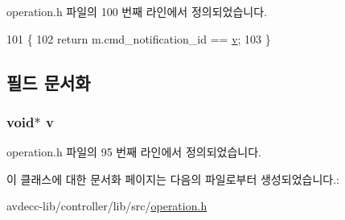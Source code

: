 operation.\+h 파일의 100 번째 라인에서 정의되었습니다.


\begin{DoxyCode}
101     \{
102         \textcolor{keywordflow}{return} m.cmd\_notification\_id == \hyperlink{classavdecc__lib_1_1notification__comp_a67806b49e20fb1170422969965db6ecb}{v};
103     \}
\end{DoxyCode}


\subsection{필드 문서화}
\subsubsection[{\texorpdfstring{v}{v}}]{\setlength{\rightskip}{0pt plus 5cm}void$\ast$ v\hspace{0.3cm}{\ttfamily [private]}}\hypertarget{classavdecc__lib_1_1notification__comp_a67806b49e20fb1170422969965db6ecb}{}\label{classavdecc__lib_1_1notification__comp_a67806b49e20fb1170422969965db6ecb}


operation.\+h 파일의 95 번째 라인에서 정의되었습니다.



이 클래스에 대한 문서화 페이지는 다음의 파일로부터 생성되었습니다.\+:\begin{DoxyCompactItemize}
\item 
avdecc-\/lib/controller/lib/src/\hyperlink{operation_8h}{operation.\+h}\end{DoxyCompactItemize}
